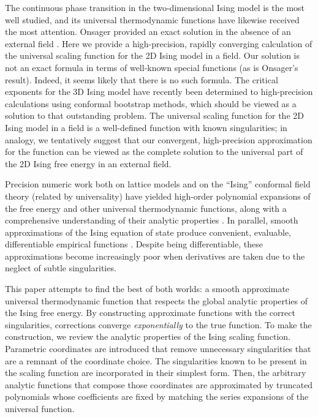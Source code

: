 \documentclass[
aps,
pre,
preprint,
longbibliography,
floatfix
]{revtex4-2}
\begin{document}
The continuous phase transition in the two-dimensional Ising model is the most
well studied, and its universal thermodynamic functions have likewise received
the most attention. Onsager provided an exact solution in the absence of an external field \cite{Onsager_1944_Crystal}. Here we provide a high-precision, rapidly converging calculation of the universal scaling function for the 2D Ising model in a field. Our solution is not an exact formula in terms of well-known special functions (as is Onsager's result). Indeed, it seems likely that there is no such formula. The critical exponents for the 3D Ising model have recently been determined to high-precision calculations using conformal bootstrap methods, which should be viewed as a solution to that outstanding problem. The universal scaling function for the 2D Ising model in a field is a well-defined function with known singularities; in analogy, we tentatively suggest that our convergent, high-precision approximation for the function can be viewed as the complete solution to the universal part of the 2D Ising free energy in an external field.

Precision numeric work both on
lattice models and on the ``Ising'' conformal field theory (related by
universality) have yielded high-order polynomial expansions of the free energy and other universal thermodynamic functions,
along with a comprehensive understanding of their analytic properties
\cite{Fonseca_2003_Ising, Mangazeev_2008_Variational, Mangazeev_2010_Scaling}.
In parallel, smooth approximations of the Ising equation of state produce
convenient, evaluable, differentiable empirical functions
\cite{Caselle_2001_The}. Despite being differentiable, these approximations
become increasingly poor when derivatives are taken due to the neglect of
subtle singularities.

This paper attempts to find the best of both worlds: a smooth approximate
universal thermodynamic function that respects the global analytic properties
of the Ising free energy. By constructing approximate functions with the
correct singularities, corrections converge \emph{exponentially} to the true
function. To make the construction, we review the analytic properties of the
Ising scaling function. Parametric coordinates are introduced that remove
unnecessary singularities that are a remnant of the coordinate choice. The
singularities known to be present in the scaling function are incorporated in
their simplest form. Then, the arbitrary analytic functions that compose those
coordinates are approximated by truncated polynomials whose coefficients are
fixed by matching the series expansions of the universal function.
\end{document}
